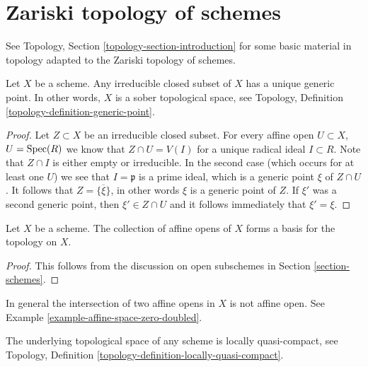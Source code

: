 \section{Zariski topology of schemes}
\label{section-topology}

\noindent
See Topology, Section \ref{topology-section-introduction}
for some basic material in topology adapted to the Zariski
topology of schemes.

\begin{lemma}
\label{lemma-scheme-sober}
Let $X$ be a scheme.
Any irreducible closed subset of $X$ has a unique generic point.
In other words, $X$ is a sober topological space, see
Topology, Definition \ref{topology-definition-generic-point}.
\end{lemma}

\begin{proof}
Let $Z \subset X$ be an irreducible closed subset.
For every affine open $U \subset X$, $U = \mathop{\rm Spec}(R)$
we know that $Z \cap U = V(I)$ for a unique
radical ideal $I \subset R$. Note that $Z \cap I$ is either
empty or irreducible. In the second case (which occurs
for at least one $U$) we see that $I = \mathfrak p$
is a prime ideal, which is a generic point $\xi$ of $Z \cap U$.
It follows that $Z = \overline{\{\xi\}}$, in other words
$\xi$ is a generic point of $Z$. If $\xi'$ was a second
generic point, then $\xi' \in Z \cap U$ and it follows
immediately that $\xi' = \xi$.
\end{proof}

\begin{lemma}
\label{lemma-basis-affine-opens}
Let $X$ be a scheme. The collection of affine opens
of $X$ forms a basis for the topology on $X$.
\end{lemma}

\begin{proof}
This follows from the discussion on open subschemes
in Section \ref{section-schemes}.
\end{proof}

\begin{remark}
\label{remark-intersection-affine-opens}
In general the intersection of two affine opens in $X$
is not affine open. See Example \ref{example-affine-space-zero-doubled}.
\end{remark}

\begin{lemma}
\label{lemma-locally-quasi-compact}
The underlying topological space of any scheme is
locally quasi-compact, see
Topology, Definition \ref{topology-definition-locally-quasi-compact}.
\end{lemma}

